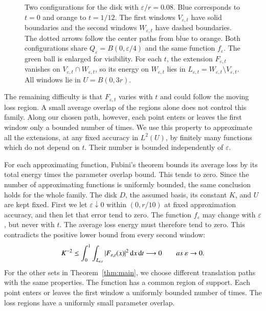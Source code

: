 \documentclass[10pt,a4paper]{amsart}
\def\d{\mathrm{d}}
\newcommand\1{\mathbbm{1}}
\newcommand{\eps}{\varepsilon}
\def\d{\mathrm{d}}
\begin{document}
\begin{figure}[H]
    \makeatletter
    \def\@captionfont{\normalfont\small}
    \makeatother
    \caption{Two configurations for the disk with $\eps/r=0.08$.
    Blue corresponds to $t=0$ and orange to $t=1/12$.
    The first windows $V_{\eps,t}$ have solid boundaries and the second
    windows $W_{\eps,t}$ have dashed boundaries. The dotted arrows follow
    the center paths from blue to orange. Both configurations share
    $Q_\eps=B(0,\eps/4)$ and the same function $f_\eps$.
    The green ball is enlarged for visibility.
    For each $t$, the extension $F_{\eps,t}$ vanishes on
    $V_{\eps,t}\cap W_{\eps,t}$, so its energy on $W_{\eps,t}$ lies in
    $L_{\eps,t}=W_{\eps,t}\setminus V_{\eps,t}$.
    All windows lie in $U=B(0,3r)$.}
    \label{fig:disk-windows}
\end{figure}

The remaining difficulty is that $F_{\eps,t}$ varies with $t$ and could
follow the moving loss region. A small average overlap of the regions alone
does not control this family. Along our chosen path, however, each point
enters or leaves the first window only a bounded number of times.
We use this property to approximate all the extensions, at any fixed
accuracy in $L^2(U)$, by finitely many functions which do not depend on $t$.
Their number is bounded independently of $\eps$.

For each approximating function, Fubini's theorem bounds its average loss
by its total energy times the parameter overlap bound.
This tends to zero. Since the number of approximating functions is uniformly
bounded, the same conclusion holds for the whole family.
The disk $D$, the assumed basis, its constant $K$, and $U$ are kept fixed.
First we let $\eps\downarrow0$ within $(0,r/10)$ at fixed approximation accuracy,
and then let that error tend to zero. The function $f_\eps$ may change with
$\eps$, but never with $t$. The average loss energy must therefore tend to zero.
This contradicts the positive lower bound from every second window:
\begin{equation*}
    K^{-2}\le
    \int_0^1\int_{L_{\eps,t}}|F_{\eps,t}(x)|^2\,\d x\,\d t
    \longrightarrow0\qquad{\rm{as}}\ \eps\to0.
\end{equation*}
For the other sets in Theorem~\ref{thm:main}, we choose different translation
paths with the same properties. The function has a common region of support.
Each point enters or leaves the first window a uniformly bounded number of
times. The loss regions have a uniformly small parameter overlap.
\end{document}
